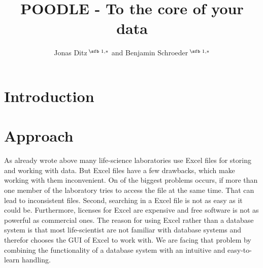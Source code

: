 \documentclass{bioinfo}
\begin{document}

\subtitle{}%

\title[POODLE]{POODLE - To the core of your data}
\author[Ditz, Schroeder]{Jonas Ditz\,$^{\text{\sfb 1,}*}$ and Benjamin Schroeder\,$^{\text{\sfb 1,}*}$} 
\address{$^{\text{\sf 1}}$Department of Informatics, Eberhard Karls University, T\"ubingen, 72076, Germany.}


\history{}%

\editor{}%


\maketitle

\section{Introduction}


\enlargethispage{12pt}

\section{Approach}

As already wrote above many life-science laboratories use Excel files for storing and working with 
data. But Excel files have a few drawbacks, which make working with them inconvenient. On of the 
biggest problems occurs, if more than one member of the laboratory tries to access the file at the 
same time. That can lead to inconsistent files. Second, searching in a Excel file is not as easy as 
it could be. Furthermore, licenses for Excel are expensive and free software is not as powerful as 
commercial ones. The reason for using Excel rather than a database system is that most life-scientist 
are not familiar with database systems and therefor chooses the GUI of Excel to work with. We are 
facing that problem by combining the functionality of a database system with an intuitive and 
easy-to-learn handling.
\end{document}
